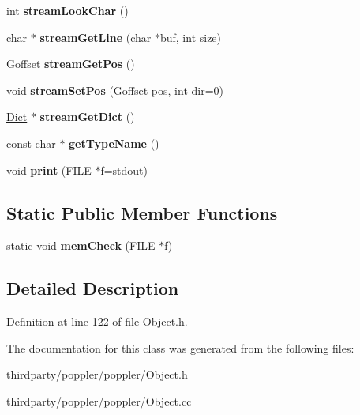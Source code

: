 \begin{DoxyCompactItemize}
\mbox{\label{class_object_adc62a6aac594f6c6c26ce42b40b563ef}} 
int {\bfseries stream\+Look\+Char} ()
\item 
\mbox{\label{class_object_a849f165a2b77236479d1c0affe2bf046}} 
char $\ast$ {\bfseries stream\+Get\+Line} (char $\ast$buf, int size)
\item 
\mbox{\label{class_object_aa98d24c519ee50a849521c848a3b5da9}} 
Goffset {\bfseries stream\+Get\+Pos} ()
\item 
\mbox{\label{class_object_a9e10409926e4f8d316681f64df0b599f}} 
void {\bfseries stream\+Set\+Pos} (Goffset pos, int dir=0)
\item 
\mbox{\label{class_object_a96eb4ab2ff0b250f5970514b98fd6ecc}} 
\hyperlink{class_dict}{Dict} $\ast$ {\bfseries stream\+Get\+Dict} ()
\item 
\mbox{\label{class_object_a5aeba0e048968a78018266af78f03fec}} 
const char $\ast$ {\bfseries get\+Type\+Name} ()
\item 
\mbox{\label{class_object_a21e509f40dc1d5bc3cb544d8aa70d7f0}} 
void {\bfseries print} (F\+I\+LE $\ast$f=stdout)
\end{DoxyCompactItemize}
\subsection*{Static Public Member Functions}
\begin{DoxyCompactItemize}
\item 
\mbox{\label{class_object_aac5178391dcca8f2be1ddb88f30ef062}} 
static void {\bfseries mem\+Check} (F\+I\+LE $\ast$f)
\end{DoxyCompactItemize}


\subsection{Detailed Description}


Definition at line 122 of file Object.\+h.



The documentation for this class was generated from the following files\+:\begin{DoxyCompactItemize}
\item 
thirdparty/poppler/poppler/Object.\+h\item 
thirdparty/poppler/poppler/Object.\+cc\end{DoxyCompactItemize}
